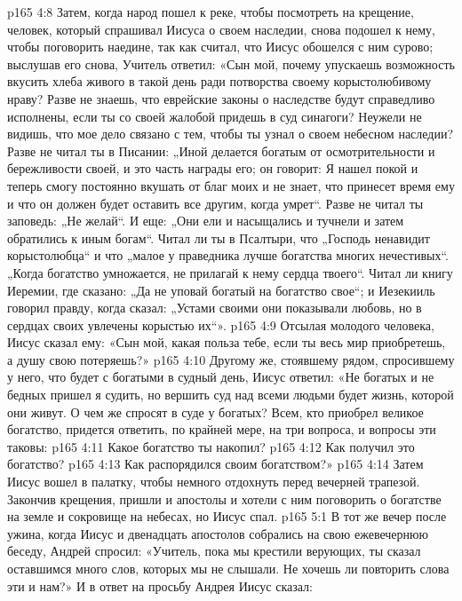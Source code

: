 \vs p165 4:8 \pc Затем, когда народ пошел к реке, чтобы посмотреть на крещение, человек, который спрашивал Иисуса о своем наследии, снова подошел к нему, чтобы поговорить наедине, так как считал, что Иисус обошелся с ним сурово; выслушав его снова, Учитель ответил: «Сын мой, почему упускаешь возможность вкусить хлеба живого в такой день ради потворства своему корыстолюбивому нраву? Разве не знаешь, что еврейские законы о наследстве будут справедливо исполнены, если ты со своей жалобой придешь в суд синагоги? Неужели не видишь, что мое дело связано с тем, чтобы ты узнал о своем небесном наследии? Разве не читал ты в Писании: „Иной делается богатым от осмотрительности и бережливости своей, и это часть награды его; он говорит: Я нашел покой и теперь смогу постоянно вкушать от благ моих и не знает, что принесет время ему и что он должен будет оставить все другим, когда умрет“. Разве не читал ты заповедь: „Не желай“. И еще: „Они ели и насыщались и тучнели и затем обратились к иным богам“. Читал ли ты в Псалтыри, что „Господь ненавидит корыстолюбца“ и что „малое у праведника лучше богатства многих нечестивых“. „Когда богатство умножается, не прилагай к нему сердца твоего“. Читал ли книгу Иеремии, где сказано: „Да не уповай богатый на богатство свое“; и Иезекииль говорил правду, когда сказал: „Устами своими они показывали любовь, но в сердцах своих увлечены корыстью их“».
\vs p165 4:9 Отсылая молодого человека, Иисус сказал ему: «Сын мой, какая польза тебе, если ты весь мир приобретешь, а душу свою потеряешь?»
\vs p165 4:10 Другому же, стоявшему рядом, спросившему у него, что будет с богатыми в судный день, Иисус ответил: «Не богатых и не бедных пришел я судить, но вершить суд над всеми людьми будет жизнь, которой они живут. О чем же спросят в суде у богатых? Всем, кто приобрел великое богатство, придется ответить, по крайней мере, на три вопроса, и вопросы эти таковы:
\vs p165 4:11 \bibnobreakspace Какое богатство ты накопил?
\vs p165 4:12 \bibnobreakspace Как получил это богатство?
\vs p165 4:13 \bibnobreakspace Как распорядился своим богатством?»
\vs p165 4:14 \pc Затем Иисус вошел в палатку, чтобы немного отдохнуть перед вечерней трапезой. Закончив крещения, пришли и апостолы и хотели с ним поговорить о богатстве на земле и сокровище на небесах, но Иисус спал.
\vs p165 5:1 В тот же вечер после ужина, когда Иисус и двенадцать апостолов собрались на свою ежевечернюю беседу, Андрей спросил: «Учитель, пока мы крестили верующих, ты сказал оставшимся много слов, которых мы не слышали. Не хочешь ли повторить слова эти и нам?» И в ответ на просьбу Андрея Иисус сказал:

